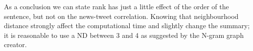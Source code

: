 As a conclusion we can state rank has just a little effect of the order of the sentence, but not on the news-tweet correlation.
Knowing that neighbourhood distance strongly affect the computational time and slightly change the summary; it is reasonable to use a ND between 3 and 4 as suggested by the N-gram graph creator.



